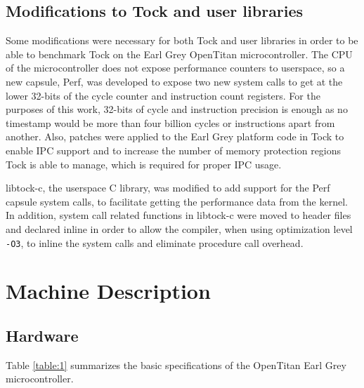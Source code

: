 \documentclass{article}
\begin{document}
\subsection{Modifications to Tock and user libraries}

Some modifications were necessary for both Tock and user libraries in order to be able to benchmark Tock on the Earl Grey OpenTitan microcontroller. The CPU of the microcontroller does not expose performance counters to userspace, so a new capsule, Perf, was developed to expose two new system calls to get at the lower 32-bits of the cycle counter and instruction count registers. For the purposes of this work, 32-bits of cycle and instruction precision is enough as no timestamp would be more than four billion cycles or instructions apart from another. Also, patches were applied to the Earl Grey platform code in Tock to enable IPC support and to increase the number of memory protection regions Tock is able to manage, which is required for proper IPC usage.

libtock-c, the userspace C library, was modified to add support for the Perf capsule system calls, to facilitate getting the performance data from the kernel. In addition, system call related functions in libtock-c were moved to header files and declared inline in order to allow the compiler, when using optimization level \texttt{-O3}, to inline the system calls and eliminate procedure call overhead.

\section{Machine Description}

\subsection{Hardware}
Table \ref{table:1} summarizes the basic specifications of the OpenTitan Earl Grey microcontroller.
\end{document}
